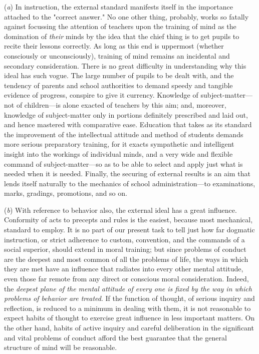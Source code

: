 \documentclass[letterpaper]{book}
\begin{document}
(\emph{a}) In instruction, the external standard manifests itself in the
importance attached to the "correct answer." No one other thing,
probably, works so fatally against focussing the attention of teachers
upon the training of mind as the domination of \emph{their} minds by the
idea that the chief thing is to get pupils to recite their lessons
correctly.
As long as this end is uppermost (whether consciously or unconsciously),
training of mind remains an incidental and secondary consideration.
There is no great difficulty in understanding why this ideal has such
vogue. The large number of pupils to be dealt with, and the tendency of
parents and school authorities to demand speedy and tangible evidence of
progress, conspire to give it currency. Knowledge of
subject-matter---not of children---is alone exacted of teachers by this
aim; and, moreover, knowledge of subject-matter only in portions
definitely prescribed and laid out, and hence mastered with comparative
ease. Education that takes as its standard the improvement of the
intellectual attitude and method of students demands more serious
preparatory training, for it exacts sympathetic and intelligent insight
into the workings of individual minds, and a very wide and flexible
command of subject-matter---so as to be able to select and apply just
what is needed when it is needed. Finally, the securing of external
results is an aim that lends itself naturally to the mechanics of school
administration---to examinations, marks, gradings, promotions, and so
on.


(\emph{b}) With reference to behavior also, the external ideal has a
great influence. Conformity of acts to precepts and rules is the
easiest, because most mechanical, standard to employ. It is no part of
our present task to tell just how far dogmatic instruction, or strict
adherence to custom, convention, and the commands of a social superior,
should extend in moral training; but since problems of conduct are the
deepest and most common of all the problems of life, the ways in which
they are met have an influence that radiates into every other mental
attitude, even those far remote from
any
direct or conscious moral consideration. Indeed, the \emph{deepest plane
of the mental attitude of every one is fixed by the way in which
problems of behavior are treated}. If the function of thought, of
serious inquiry and reflection, is reduced to a minimum in dealing with
them, it is not reasonable to expect habits of thought to exercise great
influence in less important matters. On the other hand, habits of active
inquiry and careful deliberation in the significant and vital problems
of conduct afford the best guarantee that the general structure of mind
will be
reasonable.
\end{document}
